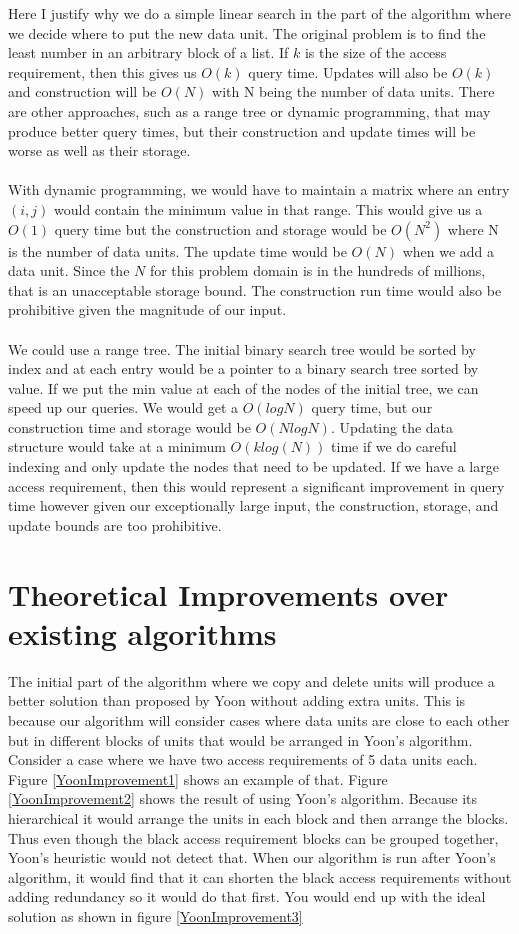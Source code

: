 \documentclass[conference]{acmsiggraph}
\begin{document}
Here I justify why we do a simple linear search in the part of the algorithm where we decide where to put the new data unit. The original problem is to find the least number in an arbitrary block of a list. If $k$ is the size of the access requirement, then this gives us $O(k)$ query time. Updates will also be $O(k)$ and construction will be $O(N)$ with N being the number of data units. There are other approaches, such as a range tree or dynamic programming, that may produce better query times, but their construction and update times will be worse as well as their storage. \\
\\
With dynamic programming, we would have to maintain a matrix where an entry $(i,j)$ would contain the minimum value in that range. This would give us a $O(1)$ query time but the construction and storage would be $O(N^2)$ where N is the number of data units. The update time would be $O(N)$ when we add a data unit. Since the $N$ for this problem domain is in the hundreds of millions, that is an unacceptable storage bound. The construction run time would also be prohibitive given the magnitude of our input. \\
\\
We could use a range tree. The initial binary search tree would be sorted by index and at each entry would be a pointer to a binary search tree sorted by value. If we put the min value at each of the nodes of the initial tree, we can speed up our queries. We would get a $O(log N)$ query time, but our construction time and storage would be $O(N log N)$. Updating the data structure would take at a minimum $O(k log(N))$ time if we do careful indexing and only update the nodes that need to be updated. If we have a large access requirement, then this would represent a significant improvement in query time however given our exceptionally large input, the construction, storage, and update bounds are too prohibitive.  


\section{Theoretical Improvements over existing algorithms}

The initial part of the algorithm where we copy and delete units will produce a better solution than proposed by Yoon without adding extra units. This is because our algorithm will consider cases where data units are close to each other but in different blocks of units that would be arranged in Yoon's algorithm. Consider a case where we have two access requirements of 5 data units each. Figure \ref{YoonImprovement1} shows an example of that. Figure \ref{YoonImprovement2} shows the result of using Yoon's algorithm. Because its hierarchical it would arrange the units in each block and then arrange the blocks. Thus even though the black access requirement blocks can be grouped together, Yoon's heuristic would not detect that. When our algorithm is run after Yoon's algorithm, it would find that it can shorten the black access requirements without adding redundancy so it would do that first. You would end up with the ideal solution as shown in figure \ref{YoonImprovement3}
\end{document}
